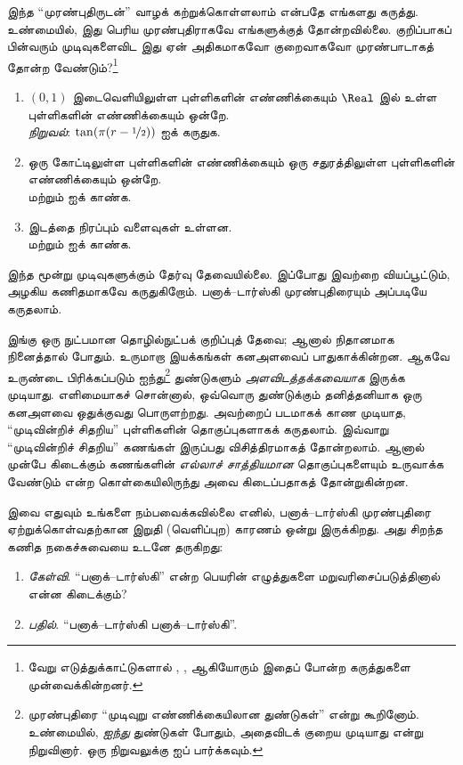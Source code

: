 \documentclass[../../../include/open-logic-section]{subfiles}
\begin{document}
இந்த ``முரண்புதிருடன்'' வாழக் கற்றுக்கொள்ளலாம் என்பதே
எங்களது கருத்து. உண்மையில், இது பெரிய முரண்புதிராகவே
எங்களுக்குத் தோன்றவில்லை. குறிப்பாகப் பின்வரும்
முடிவுகளைவிட இது ஏன் அதிகமாகவோ குறைவாகவோ
முரண்பாடாகத் தோன்ற வேண்டும்?\footnote{வேறு எடுத்துக்காட்டுகளால்
\citet[276--7]{Potter2004}, \citet[16]{Weston2003},
\citet[31, 308--9]{Wagon2016} ஆகியோரும் இதைப் போன்ற
கருத்துகளை முன்வைக்கின்றனர்.}
\begin{enumerate}
	\item $(0,1)$ இடைவெளியிலுள்ள புள்ளிகளின் எண்ணிக்கையும்
	$\Real$ இல் உள்ள புள்ளிகளின் எண்ணிக்கையும் ஒன்றே.
	\\\emph{நிறுவல்}: $\tan(\pi(r-\nicefrac{1}{2}))$ ஐக் கருதுக.
	\item ஒரு கோட்டிலுள்ள புள்ளிகளின் எண்ணிக்கையும் ஒரு
	சதுரத்திலுள்ள புள்ளிகளின் எண்ணிக்கையும் ஒன்றே.
	\\ மற்றும்
	 ஐக் காண்க.
	\item இடத்தை நிரப்பும் வளைவுகள் உள்ளன.
	\\ மற்றும்
	 ஐக் காண்க.
\end{enumerate}
இந்த மூன்று முடிவுகளுக்கும் தேர்வு தேவையில்லை. இப்போது
இவற்றை வியப்பூட்டும், அழகிய கணிதமாகவே கருதுகிறோம்.
பனாக்--டார்ஸ்கி முரண்புதிரையும் அப்படியே கருதலாம்.

இங்கு ஒரு நுட்பமான தொழில்நுட்பக் குறிப்புத் தேவை;
ஆனால் நிதானமாக நினைத்தால் போதும். உருமாறா இயக்கங்கள்
கனஅளவைப் பாதுகாக்கின்றன. ஆகவே உருண்டை பிரிக்கப்படும்
ஐந்து\footnote{முரண்புதிரை ``முடிவுறு எண்ணிக்கையிலான
துண்டுகள்'' என்று கூறினோம். உண்மையில், \citet{Robinson1947}
\emph{ஐந்து} துண்டுகள் போதும், அதைவிடக் குறைய முடியாது
என்று நிறுவினார். ஒரு நிறுவலுக்கு \citet[pp.~66--7]{Wagon2016}
ஐப் பார்க்கவும்.} துண்டுகளும் \emph{அளவிடத்தக்கவையாக}
இருக்க முடியாது. எளிமையாகச் சொன்னால், ஒவ்வொரு
துண்டுக்கும் தனித்தனியாக ஒரு கனஅளவை ஒதுக்குவது
பொருளற்றது. அவற்றைப் படமாகக் காண முடியாத,
``முடிவின்றிச் சிதறிய'' புள்ளிகளின் தொகுப்புகளாகக் கருதலாம்.
இவ்வாறு ``முடிவின்றிச் சிதறிய'' கணங்கள் இருப்பது
விசித்திரமாகத் தோன்றலாம். ஆனால் முன்பே கிடைக்கும்
கணங்களின் \emph{எல்லாச் சாத்தியமான} தொகுப்புகளையும்
உருவாக்க வேண்டும் என்ற \stagesacc{} கொள்கையிலிருந்து
அவை கிடைப்பதாகத் தோன்றுகின்றன.

இவை எதுவும் உங்களை நம்பவைக்கவில்லை எனில்,
பனாக்--டார்ஸ்கி முரண்புதிரை ஏற்றுக்கொள்வதற்கான
இறுதி (வெளிப்புற) காரணம் ஒன்று இருக்கிறது. அது
சிறந்த கணித நகைச்சுவையை உடனே தருகிறது:
\begin{enumerate}
	\item[] \emph{கேள்வி}. ``பனாக்--டார்ஸ்கி'' என்ற
	பெயரின் எழுத்துகளை மறுவரிசைப்படுத்தினால் என்ன கிடைக்கும்?
	\item[] \emph{பதில்}. ``பனாக்--டார்ஸ்கி பனாக்--டார்ஸ்கி''.
\end{enumerate}
\end{document}
